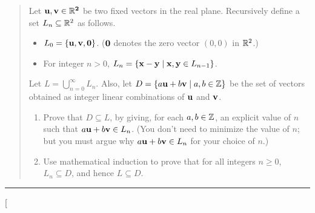 \documentclass[11pt]{article}
\begin{document}


\begin{quote}
\newcommand{\bu}{\bf u}
\newcommand{\bv}{\bf v}
\item Let $\bu,\bv \in \R^2$ be two fixed vectors in the real plane.
Recursively define a set $L_n \subseteq \R^2$
as follows.
\begin{itemize}
\item $L_0 = \{\bu,\bv,{\bf 0}\}$. (${\bf 0}$ denotes the zero vector 
$(0,0)$ in $\R^2$.)
\item For integer $n > 0$, $L_n = \{ {\bf x}- {\bf y} \mid {\bf x}, {\bf y}
  \in L_{n-1} \}$.
\end{itemize}
Let $L = \bigcup_{n=0}^\infty L_n$. Also, let $D = \{ a{\bf u}+b{\bf
  v} \mid a,b \in \Z \}$ be the set of vectors obtained as integer
linear combinations of ${\bf u}$ and ${\bf v}$.
\begin{enumerate}
\item Prove that $D \subseteq L$, by giving, for each $a,b\in\Z$,
an explicit value of $n$ such that $a{\bf u}+b{\bf v}\in L_n$. 
(You don't need to
minimize the value of $n$; but you must argue why $a{\bf u}+b{\bf v} \in L_n$ for your
choice of $n$.)
\item Use mathematical induction to prove that for all integers $n\ge 0$,
$L_n \subseteq D$, and hence $L \subseteq D$.
\end{enumerate}
\end{quote}
\hrule


\begin{solution}[
\end{solution}
\end{document}
